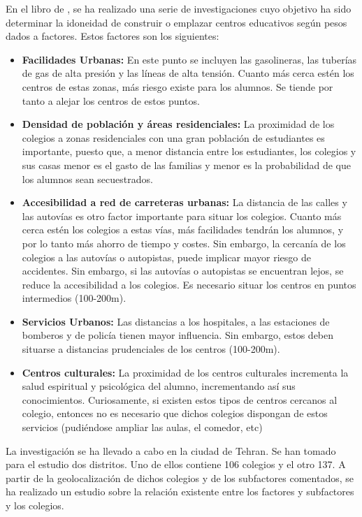 En el libro de , se ha realizado una serie de investigaciones cuyo objetivo ha sido determinar la idoneidad de construir o emplazar centros educativos según pesos dados a factores. Estos factores son los siguientes:

\begin{itemize}
	\item \textbf{Facilidades Urbanas:} En este punto se incluyen las gasolineras, las tuberías de gas de alta presión y las líneas de alta tensión. Cuanto más cerca estén los centros de estas zonas, más riesgo existe para los alumnos. Se tiende por tanto a alejar los centros de estos puntos.
	\item \textbf{Densidad de población y áreas residenciales:} La proximidad de los colegios a zonas residenciales con una gran población de estudiantes es importante, puesto que, a menor distancia entre los estudiantes, los colegios y sus casas menor es el gasto de las familias y menor es la probabilidad de que los alumnos sean secuestrados.
	\item\textbf{ Accesibilidad a red de carreteras urbanas:} La distancia de las calles y las autovías es otro factor importante para situar los colegios. Cuanto más cerca estén los colegios a estas vías, más facilidades tendrán los alumnos, y por lo tanto más ahorro de tiempo y costes.
	Sin embargo, la cercanía de los colegios a las autovías o autopistas, puede implicar mayor riesgo de accidentes. Sin embargo, si las autovías o autopistas se encuentran lejos, se reduce la accesibilidad a los colegios. Es necesario situar los centros en puntos intermedios (100-200m).
	\item \textbf{Servicios Urbanos:} Las distancias a los hospitales, a las estaciones de bomberos y de policía tienen mayor influencia. Sin embargo, estos deben situarse a distancias prudenciales de los centros (100-200m).
	\item \textbf{Centros culturales:} La proximidad de los centros culturales incrementa la salud espiritual y psicológica del alumno, incrementando así sus conocimientos. Curiosamente, si existen estos tipos de centros cercanos al colegio, entonces no es necesario que dichos colegios dispongan de estos servicios (pudiéndose ampliar las aulas, el comedor, etc)
\end{itemize}                     

La investigación se ha llevado a cabo en la ciudad de Tehran. Se han tomado para el estudio dos distritos. Uno de ellos contiene 106 colegios y el otro 137. A partir de la geolocalización de dichos colegios y de los subfactores comentados, se ha realizado un estudio sobre la relación existente entre los factores y subfactores y los colegios.

